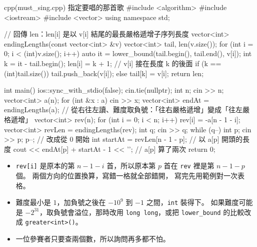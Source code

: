 \begin{example}[label=ex:ss-sing]{cpp}{(must\_sing.cpp) 指定要唱的那首歌}
#include <algorithm>
#include <iostream>
#include <vector>
using namespace std;

// 回傳 len：len[i] 是以 v[i] 結尾的最長嚴格遞增子序列長度
vector<int> endingLengths(const vector<int> &v) {
    vector<int> tail, len(v.size());
    for (int i = 0; i < (int)v.size(); i++) {
        auto it = lower_bound(tail.begin(), tail.end(), v[i]);
        int k = it - tail.begin();
        len[i] = k + 1;                 // v[i] 接在長度 k 的後面
        if (k == (int)tail.size()) {
            tail.push_back(v[i]);
        } else {
            tail[k] = v[i];
        }
    }
    return len;
}

int main() {
    ios::sync_with_stdio(false);
    cin.tie(nullptr);
    int n;
    cin >> n;
    vector<int> a(n);
    for (int &x : a) {
        cin >> x;
    }
    vector<int> endAt = endingLengths(a);
    // 從右往左讀、難度取負號：「往右嚴格遞增」變成「往左嚴格遞增」
    vector<int> rev(n);
    for (int i = 0; i < n; i++) {
        rev[i] = -a[n - 1 - i];
    }
    vector<int> revLen = endingLengths(rev);
    int q;
    cin >> q;
    while (q--) {
        int p;
        cin >> p;
        p--;                                    // 改成從 0 開始
        int startAt = revLen[n - 1 - p];   // 以 a[p] 開頭的長度
        cout << endAt[p] + startAt - 1 << '\n';   // a[p] 算了兩次
    }
    return 0;
}
\end{example}


\begin{itemize}
\item \texttt{rev[i]} 是原本的第 $n - 1 - i$ 首，所以原本第 $p$ 首在
\texttt{rev} 裡是第 $n - 1 - p$ 個。 兩個方向的位置換算，寫錯一格就全部錯開，
寫完先用範例對一次表格。
\item 難度最小是 $1$，加負號之後在 $-10^9$ 到 $-1$ 之間，\texttt{int} 裝得下。
如果難度可能是 $-2^{31}$，取負號會溢位，那時改用 \texttt{long long}，或把
\texttt{lower\_bound} 的比較改成 \texttt{greater<int>()}。
\item 一位參賽者只要查兩個數，所以詢問再多都不怕。
\end{itemize}

